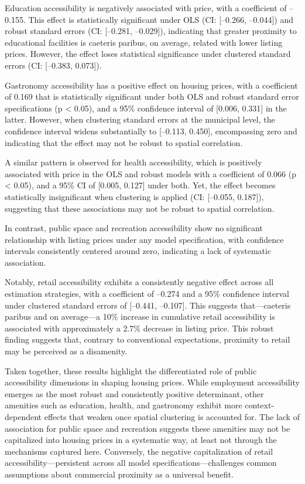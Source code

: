\documentclass[
  12pt,
]{report}
\begin{document}
Education accessibility is negatively associated with price, with a
coefficient of --0.155. This effect is statistically significant under
OLS (CI: {[}--0.266, --0.044{]}) and robust standard errors (CI:
{[}--0.281, --0.029{]}), indicating that greater proximity to
educational facilities is caeteris paribus, on average, related with
lower listing prices. However, the effect loses statistical significance
under clustered standard errors (CI: {[}--0.383, 0.073{]}).

Gastronomy accessibility has a positive effect on housing prices, with a
coefficient of 0.169 that is statistically significant under both OLS
and robust standard error specifications (p \textless{} 0.05), and a
95\% confidence interval of {[}0.006, 0.331{]} in the latter. However,
when clustering standard errors at the municipal level, the confidence
interval widens substantially to {[}--0.113, 0.450{]}, encompassing zero
and indicating that the effect may not be robust to spatial correlation.

A similar pattern is observed for health accessibility, which is
positively associated with price in the OLS and robust models with a
coefficient of 0.066 (p \textless{} 0.05), and a 95\% CI of {[}0.005,
0.127{]} under both. Yet, the effect becomes statistically insignificant
when clustering is applied (CI: {[}--0.055, 0.187{]}), suggesting that
these associations may not be robust to spatial correlation.

In contrast, public space and recreation accessibility show no
significant relationship with listing prices under any model
specification, with confidence intervals consistently centered around
zero, indicating a lack of systematic association.

Notably, retail accessibility exhibits a consistently negative effect
across all estimation strategies, with a coefficient of --0.274 and a
95\% confidence interval under clustered standard errors of {[}--0.441,
--0.107{]}. This suggests that---caeteris paribus and on average---a
10\% increase in cumulative retail accessibility is associated with
approximately a 2.7\% decrease in listing price. This robust finding
suggests that, contrary to conventional expectations, proximity to
retail may be perceived as a disamenity.

Taken together, these results highlight the differentiated role of
public accessibility dimensions in shaping housing prices. While
employment accessibility emerges as the most robust and consistently
positive determinant, other amenities such as education, health, and
gastronomy exhibit more context-dependent effects that weaken once
spatial clustering is accounted for. The lack of association for public
space and recreation suggests these amenities may not be capitalized
into housing prices in a systematic way, at least not through the
mechanisms captured here. Conversely, the negative capitalization of
retail accessibility---persistent across all model
specifications---challenges common assumptions about commercial
proximity as a universal benefit.
\end{document}
